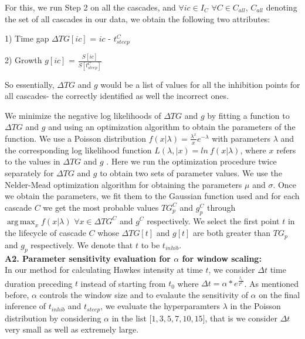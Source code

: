\documentclass[smallextended]{svjour3}       %
\theoremstyle{definition}
\DeclareMathOperator*{\argmaxA}{arg\,max}
\begin{document}
For this, we run Step 2 on all the cascades, and $\forall ic \in I_C$  $\forall C \in C_{all}$, $C_{all} $ denoting the set of all cascades in our data, we obtain the following two attributes:

1) Time gap $\Delta TG[ic] $ = $ic $  - $t_{steep}^C $

2) Growth $ g[ic] $ = $\frac{S[ic]}{S[t_{steep}^C]} $

So essentially, $\Delta TG $ and $g $ would be a list of values for all the inhibition points for all cascades- the correctly identified as well the incorrect ones.

We minimize the negative log likelihoods of $\Delta TG $ and $g $ by fitting a function to $\Delta TG $ and $g$ and using an optimization algorithm to obtain the parameters of the function. We use a Poisson distribution $ f(x|\lambda) = \frac{\lambda^x}{x} e^{-\lambda}$ with parameters $\lambda $ and the  corresponding log likelihood function  $L(\lambda, | x) = ln \  f(x| \lambda) $, where $x$ refers to the values in $\Delta TG $ and $g $ . Here we run the optimization procedure twice separately for $\Delta TG$ and $g $ to obtain two sets of parameter values. We use the Nelder-Mead optimization algorithm \cite{nelder} for obtaining the parameters $\mu $ and $\sigma$. Once we obtain the parameters, we fit them to the Gaussian function used and for each cascade $C$ we get the most probable values $TG_p^C$ and $g_p^C$ through $\argmaxA_x { f(x|\lambda)} $ $ \forall x \in \Delta TG^C $ and $ g^C $ respectively.
We select the first point $t $ in the lifecycle of cascade $C $ whose $\Delta TG[t] $ and $g[t] $ are both greater than $TG_p$ and $g_p$ respectively. We denote that $t$ to be $t_{inhib} $. 
\\

\textbf{A2. Parameter sensitivity evaluation for $\alpha$ for window scaling:}
\label{app:A2}
\\

In our method for calculating Hawkes intensity at time $t$, we consider $\Delta t$ time duration preceding $t$ instead of starting from $t_0$ where $\Delta t = \alpha * e^{\frac{t_i}{T^C}} $. As mentioned before, $\alpha$ controls the window size and to evalaute the sensitivity of $\alpha$ on the final inference of $t_{inhib}$ and $t_{steep}$, we evaluate the hyperparamters $\lambda$ in the Poisson distribution by considering $\alpha$ in the list [$1, 3, 5, 7, 10, 15]$, that is we consider $\Delta t$ very small as well as extremely large. 
\end{document}
